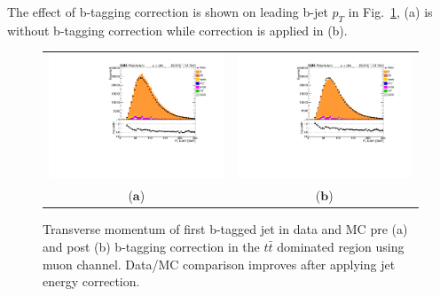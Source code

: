 The effect of b-tagging correction is shown on leading b-jet $p_{T}$ in Fig.~\ref{fig:btag_correction}, (a) is without b-tagging correction while correction is applied in (b). 
\begin{figure}[htp]
\centering
\begin{tabular}{cc}
\hspace{-0.5cm}
\includegraphics[scale=0.45]{fig/chapt7/correction/btag_nocorrection_Pt_bJet1.pdf}
& \hspace{-1.50cm} \includegraphics[scale=0.45]{fig/chapt7/correction/btag_correction_Pt_bJet1.pdf}\\
  \qquad ($\mathbf{a}$)\qquad\qquad&($\mathbf{b}$)\qquad\qquad\qquad\qquad \\
\end{tabular}
\caption{Transverse momentum of first b-tagged jet in data and MC pre (a) and post (b) b-tagging correction in the $t\bar{t}$ dominated region using muon channel. Data/MC comparison improves after applying jet energy correction.}\label{fig:btag_correction}
\end{figure}

